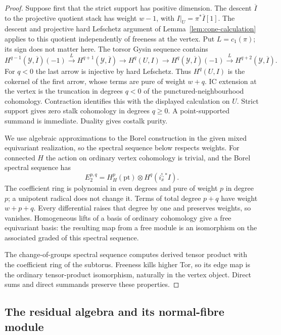 \documentclass[10pt,a4paper]{amsart}
\begin{document}
\begin{proof}
Suppose first that the strict support has positive dimension.  The
descent $\overline I$ to the projective quotient stack has weight $w-1$,
with $I|_U=\pi^*\overline I[1]$.  The descent and projective hard
Lefschetz argument of Lemma~\ref{lem:cone-calculation} applies to this
quotient independently of freeness at the vertex.  Put $L=c_1(\pi)$;
its sign does not matter here.  The torsor Gysin sequence contains
\[
 H^{q-1}(\mathcal Y,\overline I)(-1)
 \xrightarrow{L}H^{q+1}(\mathcal Y,\overline I)
 \longrightarrow H^q(U,I)
 \longrightarrow H^q(\mathcal Y,\overline I)(-1)
 \xrightarrow{L}H^{q+2}(\mathcal Y,\overline I).
\]
For $q<0$ the last arrow is injective by hard Lefschetz.  Thus $H^q(U,I)$
is the cokernel of the first arrow, whose terms are pure of weight
$w+q$.  IC extension at the vertex is the truncation in degrees $q<0$
of the punctured-neighbourhood cohomology.  Contraction identifies this
with the displayed calculation on $U$.  Strict support gives zero
stalk cohomology in degrees $q\geq0$.  A point-supported summand is
immediate.  Duality gives costalk purity.

We use algebraic approximations to the Borel construction in the given
mixed equivariant realization, so the spectral sequence below respects
weights.  For connected $H$ the action on ordinary vertex cohomology is trivial,
and the Borel spectral sequence has
\[
 E_2^{p,q}=H_H^p(\mathrm{pt})\otimes H^q(i_x^{!,*}I).
\]
The coefficient ring is polynomial in even degrees and pure of weight
$p$ in degree $p$; a unipotent radical does not change it.
Terms of total degree $p+q$ have weight $w+p+q$.  Every differential
raises that degree by one and preserves weights, so vanishes.
Homogeneous lifts of a basis of ordinary cohomology give a free
equivariant basis: the resulting map from a free module is an
isomorphism on the associated graded of this spectral sequence.

The change-of-groups spectral sequence computes derived tensor product
with the coefficient ring of the subtorus.  Freeness kills higher Tor,
so its edge map is the ordinary tensor-product isomorphism, naturally
in the vertex object.  Direct sums and direct summands preserve these
properties.
\end{proof}

\subsection{The residual algebra and its normal-fibre module}
\end{document}
